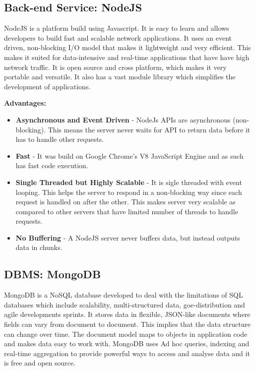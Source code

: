\documentclass[11pt]{article}
\begin{document}
		\subsection{Back-end Service: NodeJS}
		\begin{flushleft}
			NodeJS is a platform build using Javascript. It is easy to learn and allows developers to build fast and scalable network applications. It uses an event driven, non-blocking I/O model that makes it lightweight and very efficient. This makes it suited for data-intensive and real-time applications that have have high network traffic. It is open source and cross platform, which makes it very portable and versatile. It also has a vast module library which simplifies the development of applications.
				
		\end{flushleft}
		\textbf{Advantages:}
		\begin{itemize}
			\item \textbf{Asynchronous and Event Driven} - NodeJs APIs are asynchronous (non-blocking). This means the server never waits for API to return data before it has to handle other requests.
			\item \textbf{Fast} - It was build on Google Chrome's V8 JavaScript Engine and as such has fast code execution.
			\item \textbf{Single Threaded but Highly Scalable} - It is sigle threaded with event looping. This helps the server to respond in a non-blocking way since each request is handled on after the other. This makes server very scalable as compared to other servers that have limited number of threads to handle requests.
			\item \textbf{No Buffering} - A NodeJS server never buffers data, but instead outputs data in chunks.
		\end{itemize}
			
		\subsection{DBMS: MongoDB}
		\begin{flushleft}
			MongoDB is a NoSQL database developed to deal with the limitations of SQL databases which include scalability, multi-structured data, goe-distribution and agile developments sprints. It stores data in flexible, JSON-like documents where fields can vary from document to document. This implies that the data structure can change over time. The document model maps to objects in application code and makes data easy to work with. MongoDB uses Ad hoc queries, indexing and real-time aggregation to provide powerful ways to access and analyse data and it is free and open source.
		\end{flushleft}
\end{document}
